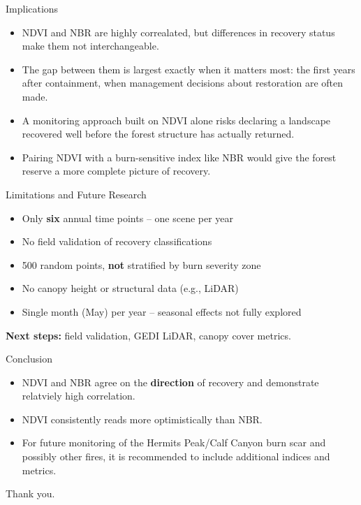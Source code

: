 \documentclass[10pt, aspectratio=169]{beamer}
\begin{document}
\begin{frame}{Implications}
\begin{itemize}
    \item NDVI and NBR are highly correalated, but differences in recovery status make them not interchangeable. 
    \item The gap between them is largest exactly when it matters most: the first years after containment, when management decisions about restoration are often made.
    \item A monitoring approach built on NDVI alone risks declaring a landscape recovered well before the forest structure has actually returned.
    \item Pairing NDVI with a burn-sensitive index like NBR would give the forest reserve a more complete picture of recovery.
\end{itemize}
\end{frame}

\begin{frame}{Limitations and Future Research}
\begin{itemize}
    \item Only \textbf{six} annual time points -- one scene per year
    \item No field validation of recovery classifications
    \item 500 random points, \textbf{not} stratified by burn severity zone
    \item No canopy height or structural data (e.g., LiDAR)
    \item Single month (May) per year -- seasonal effects not fully explored
\end{itemize}

\vspace{6pt}
\textbf{Next steps:} field validation, GEDI LiDAR, canopy cover metrics.
\end{frame}

\begin{frame}{Conclusion}
\begin{itemize}
    \item NDVI and NBR agree on the \textbf{direction} of recovery and demonstrate relatviely high correlation.
    \item NDVI consistently reads more optimistically than NBR.
    \item For future monitoring of the Hermits Peak/Calf Canyon burn scar and possibly other fires, it is recommended to include additional indices and metrics.  
\end{itemize}

\vspace{16pt}
\centering
\Large Thank you.
\end{frame}
\end{document}

